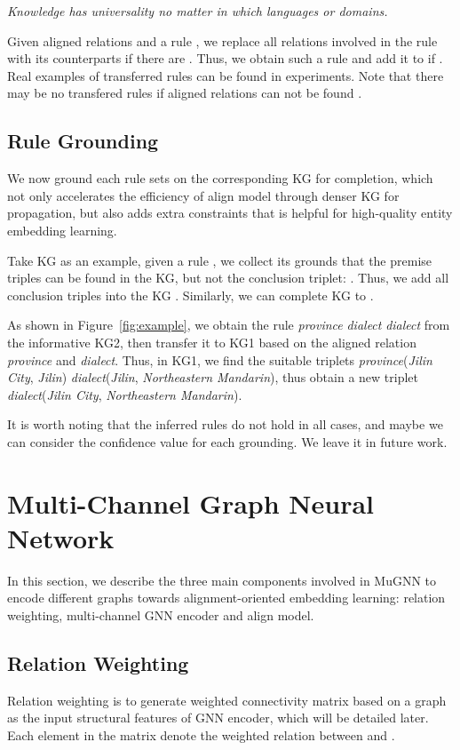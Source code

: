 \documentclass[11pt,a4paper]{article}
\begin{document}
\textit{Knowledge has universality no matter in which languages or domains.}

Given aligned relations  and a rule , we replace all relations involved in the rule  with its counterparts if there are . Thus, we obtain such a rule  and add it to  if . Real examples of transferred rules can be found in experiments. Note that there may be no transfered rules if aligned relations can not be found .

\subsection{Rule Grounding}
We now ground each rule sets on the corresponding KG for completion, which not only accelerates the efficiency of align model through denser KG for propagation, but also adds extra constraints that is helpful for high-quality entity embedding learning.

Take KG  as an example, given a rule , we collect its grounds that the premise triples can be found in the KG, but not the conclusion triplet: . Thus, we add all conclusion triples into the KG . Similarly, we can complete KG  to .

As shown in Figure~\ref{fig:example}, we obtain the rule \textit{province}  \textit{dialect}  \textit{dialect} from the informative KG2, then transfer it to KG1 based on the aligned relation \textit{province} and \textit{dialect}. Thus, in KG1, we find the suitable triplets \textit{province}(\textit{Jilin City}, \textit{Jilin})  \textit{dialect}(\textit{Jilin}, \textit{Northeastern Mandarin}), thus obtain a new triplet \textit{dialect}(\textit{Jilin City}, \textit{Northeastern Mandarin}).

It is worth noting that the inferred rules do not hold in all cases, and maybe we can consider the confidence value for each grounding. We leave it in future work.

\section{Multi-Channel Graph Neural Network}
In this section, we describe the three main components involved in MuGNN to encode different graphs towards alignment-oriented embedding learning: relation weighting, multi-channel GNN encoder and align model.

\subsection{Relation Weighting}
Relation weighting is to generate weighted connectivity matrix  based on a graph  as the input structural features of GNN encoder, which will be detailed later. Each element  in the matrix denote the weighted relation between  and .
\end{document}
